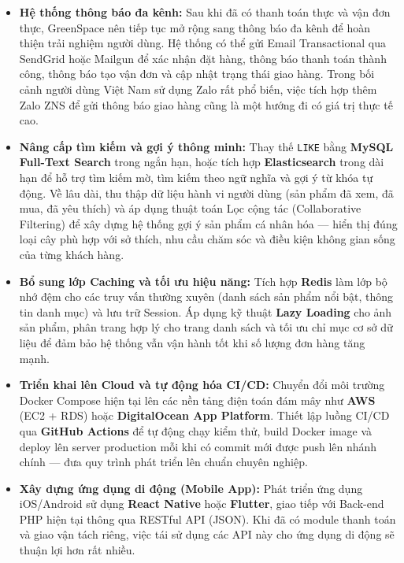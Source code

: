 \documentclass[11pt, a4paper]{article}
\begin{document}
\begin{itemize}[leftmargin=*]
    Ngoài ra, các lời gọi ra bên ngoài cần được bao bọc bởi cơ chế xử lý lỗi,
    timeout và ghi log chi tiết. Ví dụ, nếu API vận chuyển tạm thời không phản
    hồi, hệ thống có thể cho phép admin tạo vận đơn lại thủ công sau; nếu
    webhook thanh toán đến chậm, đơn hàng vẫn ở trạng thái chờ thay vì bị hủy
    ngay. Đây là các tình huống rất thường gặp khi kết nối hệ thống thực tế và
    cần được dự trù từ giai đoạn thiết kế.

    \item \textbf{Hệ thống thông báo đa kênh:}
    Sau khi đã có thanh toán thực và vận đơn thực, GreenSpace nên tiếp tục mở
    rộng sang thông báo đa kênh để hoàn thiện trải nghiệm người dùng. Hệ thống
    có thể gửi Email Transactional qua SendGrid hoặc Mailgun để xác nhận đặt
    hàng, thông báo thanh toán thành công, thông báo tạo vận đơn và cập nhật
    trạng thái giao hàng. Trong bối cảnh người dùng Việt Nam sử dụng Zalo rất
    phổ biến, việc tích hợp thêm Zalo ZNS để gửi thông báo giao hàng cũng là
    một hướng đi có giá trị thực tế cao.

    \item \textbf{Nâng cấp tìm kiếm và gợi ý thông minh:}
    Thay thế \texttt{LIKE} bằng \textbf{MySQL Full-Text Search} trong ngắn
    hạn, hoặc tích hợp \textbf{Elasticsearch} trong dài hạn để hỗ trợ tìm
    kiếm mờ, tìm kiếm theo ngữ nghĩa và gợi ý từ khóa tự động. Về lâu dài,
    thu thập dữ liệu hành vi người dùng (sản phẩm đã xem, đã mua, đã yêu
    thích) và áp dụng thuật toán Lọc cộng tác (Collaborative Filtering) để
    xây dựng hệ thống gợi ý sản phẩm cá nhân hóa --- hiển thị đúng loại cây
    phù hợp với sở thích, nhu cầu chăm sóc và điều kiện không gian sống của
    từng khách hàng.

    \item \textbf{Bổ sung lớp Caching và tối ưu hiệu năng:}
    Tích hợp \textbf{Redis} làm lớp bộ nhớ đệm cho các truy vấn thường xuyên
    (danh sách sản phẩm nổi bật, thông tin danh mục) và lưu trữ Session. Áp
    dụng kỹ thuật \textbf{Lazy Loading} cho ảnh sản phẩm, phân trang hợp lý
    cho trang danh sách và tối ưu chỉ mục cơ sở dữ liệu để đảm bảo hệ thống vẫn
    vận hành tốt khi số lượng đơn hàng tăng mạnh.

    \item \textbf{Triển khai lên Cloud và tự động hóa CI/CD:}
    Chuyển đổi môi trường Docker Compose hiện tại lên các nền tảng điện toán
    đám mây như \textbf{AWS} (EC2 + RDS) hoặc \textbf{DigitalOcean App
    Platform}. Thiết lập luồng CI/CD qua \textbf{GitHub Actions} để tự động
    chạy kiểm thử, build Docker image và deploy lên server production mỗi khi
    có commit mới được push lên nhánh chính --- đưa quy trình phát triển lên
    chuẩn chuyên nghiệp.

    \item \textbf{Xây dựng ứng dụng di động (Mobile App):}
    Phát triển ứng dụng iOS/Android sử dụng \textbf{React Native} hoặc
    \textbf{Flutter}, giao tiếp với Back-end PHP hiện tại thông qua RESTful
    API (JSON). Khi đã có module thanh toán và giao vận tách riêng, việc tái
    sử dụng các API này cho ứng dụng di động sẽ thuận lợi hơn rất nhiều.
\end{itemize}
\end{document}
